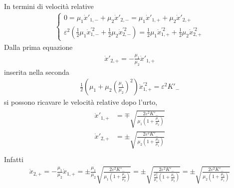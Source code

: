 \documentclass[letterpaper,10pt,italian]{jupyterBook}
\begin{document}
\sphinxAtStartPar
In termini di velocità relative
\begin{equation*}
\begin{split}\begin{cases}
  0 = \mu_1 \dot{x}'_{1,-} + \mu_2 \dot{x}'_{2,-} = \mu_1 \dot{x}'_{1,+} + \mu_2 \dot{x}'_{2,+} \\
  \varepsilon^2 \left( \frac{1}{2} \mu_1 \dot{x}^{'2}_{1,-} + \frac{1}{2} \mu_2 \dot{x}^{'2}_{2,-} \right) = \frac{1}{2} \mu_1 \dot{x}^{'2}_{1,+} + \frac{1}{2} \mu_2 \dot{x}^{'2}_{2,+}
\end{cases}\end{split}
\end{equation*}
\sphinxAtStartPar
Dalla prima equazione
\begin{equation*}
\begin{split}\dot{x}'_{2,+} = - \frac{\mu_1}{\mu_2} \dot{x}'_{1,+} \end{split}
\end{equation*}
\sphinxAtStartPar
inserita nella seconda
\begin{equation*}
\begin{split}\frac{1}{2} \left( \mu_1 + \mu_2 \left( \frac{\mu_1}{\mu_2} \right)^2 \right) \dot{x}^{'2}_{1,+} = \varepsilon^2 K'_-\end{split}
\end{equation*}
\sphinxAtStartPar
si possono ricavare le velocità relative dopo l’urto,
\begin{equation*}
\begin{split}\begin{aligned}
  \dot{x}'_{1,+} & = \mp \sqrt{ \frac{2 \varepsilon^2 K'_-}{ \mu_1 \left( 1 + \frac{\mu_1}{\mu_2} \right)} } \\
  \dot{x}'_{2,+} & = \pm \sqrt{ \frac{2 \varepsilon^2 K'_-}{ \mu_2 \left( 1 + \frac{\mu_2}{\mu_1} \right)} } \\
\end{aligned}\end{split}
\end{equation*}
\sphinxAtStartPar
Infatti
\begin{equation*}
\begin{split}
  \dot{x}_{2,+}
    = - \frac{\mu_1}{\mu_2} \dot{x}_{1,+} 
    = \pm \frac{\mu_1}{\mu_2} \sqrt{ \frac{2 \varepsilon^2 K'_-}{ \mu_1 \left( 1 + \frac{\mu_1}{\mu_2} \right)} }
    = \pm \sqrt{ \frac{2 \varepsilon^2 K'_-}{ \frac{\mu_2^2}{\mu_1} \left( 1 + \frac{\mu_1}{\mu_2} \right)} } 
    = \pm \sqrt{ \frac{2 \varepsilon^2 K'_-}{ \mu_2 \left( 1 + \frac{\mu_2}{\mu_1} \right)} } 
\end{split}
\end{equation*}
\end{document}
